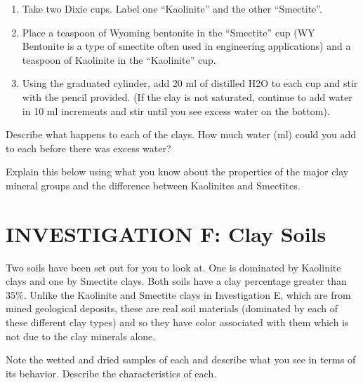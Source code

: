 \documentclass[
  letterpaper,
  twocolumn,
  portrait]{scrbook}
\providecommand{\tightlist}{%
  \setlength{\itemsep}{0pt}\setlength{\parskip}{0pt}}\usepackage{longtable,booktabs,array}
\begin{document}
\begin{enumerate}
\def\labelenumi{\arabic{enumi}.}
\tightlist
\item
  Take two Dixie cups. Label one ``Kaolinite'' and the other
  ``Smectite''.
\item
  Place a teaspoon of Wyoming bentonite in the ``Smectite'' cup (WY
  Bentonite is a type of smectite often used in engineering
  applications) and a teaspoon of Kaolinite in the ``Kaolinite'' cup.
\item
  Using the graduated cylinder, add 20 ml of distilled H2O to each cup
  and stir with the pencil provided. (If the clay is not saturated,
  continue to add water in 10 ml increments and stir until you see
  excess water on the bottom).
\end{enumerate}

Describe what happens to each of the clays. How much water (ml) could
you add to each before there was excess water?

Explain this below using what you know about the properties of the major
clay mineral groups and the difference between Kaolinites and Smectites.

\hypertarget{investigation-f-clay-soils}{%
\section{INVESTIGATION F: Clay Soils}\label{investigation-f-clay-soils}}

Two soils have been set out for you to look at. One is dominated by
Kaolinite clays and one by Smectite clays. Both soils have a clay
percentage greater than 35\%. Unlike the Kaolinite and Smectite clays in
Investigation E, which are from mined geological deposits, these are
real soil materials (dominated by each of these different clay types)
and so they have color associated with them which is not due to the clay
minerals alone.

Note the wetted and dried samples of each and describe what you see in
terms of its behavior. Describe the characteristics of each.

 
  \providecommand{\huxb}[2]{\arrayrulecolor[RGB]{#1}\global\arrayrulewidth=#2pt}
  \providecommand{\huxvb}[2]{\color[RGB]{#1}\vrule width #2pt}
  \providecommand{\huxtpad}[1]{\rule{0pt}{#1}}
  \providecommand{\huxbpad}[1]{\rule[-#1]{0pt}{#1}}
\end{document}
